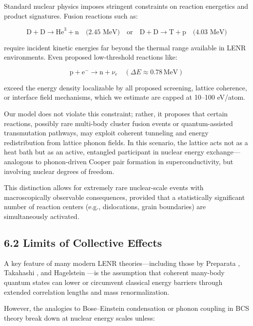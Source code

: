     Standard nuclear physics imposes stringent constraints on reaction energetics and product signatures. Fusion reactions such as:
    
    \[
    \text{D} + \text{D} \rightarrow \text{He}^3 + \text{n} \quad \text{(2.45 MeV)}
    \quad \text{or} \quad
    \text{D} + \text{D} \rightarrow \text{T} + \text{p} \quad \text{(4.03 MeV)}
    \]
    
    require incident kinetic energies far beyond the thermal range available in LENR environments. Even proposed low-threshold reactions like:
    
    \[
    \text{p} + \text{e}^- \rightarrow \text{n} + \nu_e \quad (\Delta E \approx 0.78\, \text{MeV})
    \]
    
    exceed the energy density localizable by all proposed screening, lattice coherence, or interface field mechanisms, which we estimate are capped at 10–100 eV/atom.
    
    Our model does not violate this constraint; rather, it proposes that certain reactions, possibly rare multi-body cluster fusion events or quantum-assisted transmutation pathways, may exploit coherent tunneling and energy redistribution from lattice phonon fields. In this scenario, the lattice acts not as a heat bath but as an active, entangled participant in nuclear energy exchange—analogous to phonon-driven Cooper pair formation in superconductivity, but involving nuclear degrees of freedom.
    
    This distinction allows for extremely rare nuclear-scale events with macroscopically observable consequences, provided that a statistically significant number of reaction centers (e.g., dislocations, grain boundaries) are simultaneously activated.
    
    \subsection{6.2 Limits of Collective Effects}
    
    A key feature of many modern LENR theories—including those by Preparata \cite{preparata1991}, Takahashi \cite{takahashi2004}, and Hagelstein \cite{hagelstein2015}—is the assumption that coherent many-body quantum states can lower or circumvent classical energy barriers through extended correlation lengths and mass renormalization.
    
    However, the analogies to Bose–Einstein condensation or phonon coupling in BCS theory break down at nuclear energy scales unless:
    
